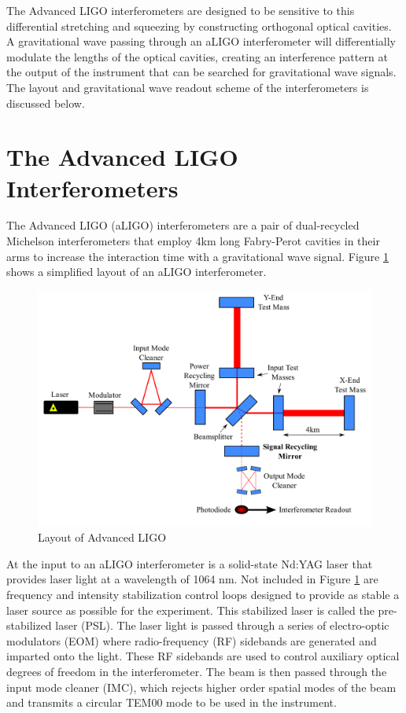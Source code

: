 The Advanced LIGO interferometers are designed to be sensitive 
to this differential stretching and squeezing by constructing orthogonal 
optical cavities. A gravitational wave passing through an aLIGO interferometer 
will differentially 
modulate the lengths of the optical cavities, creating an interference 
pattern at the output of the instrument that can be searched for 
gravitational wave signals. The layout and gravitational wave readout scheme 
of the interferometers is discussed below.

\section{The Advanced LIGO Interferometers}\label{sec:aligo}

The Advanced LIGO (aLIGO) interferometers are a pair of dual-recycled Michelson interferometers 
that employ 4km long Fabry-Perot cavities in their arms to increase the interaction time with a 
gravitational wave signal. 
Figure \ref{fig:aligo} shows a simplified layout of an aLIGO interferometer. 

\begin{figure}[ht!]
\includegraphics[width=\textwidth]{figures/introduction/ALIGO_layout}
\caption[Layout of Advanced LIGO]{Layout of Advanced LIGO}
\label{fig:aligo}
\end{figure}

At the input to an aLIGO interferometer is a solid-state Nd:YAG laser that provides laser light 
at a wavelength of 1064 nm. Not included in Figure \ref{fig:aligo} are frequency and 
intensity stabilization control loops designed to provide as stable a laser source as 
possible for the experiment. This stabilized laser is called the pre-stabilized laser 
(PSL). The laser light is passed through a series of 
electro-optic modulators (EOM) where radio-frequency (RF) sidebands are generated 
and imparted onto the light. These RF sidebands are used to control auxiliary optical 
degrees of freedom in the interferometer. The beam is then passed through the 
input mode cleaner (IMC), which rejects higher order spatial modes of the beam 
and transmits a circular TEM00 mode to be used in the instrument.

